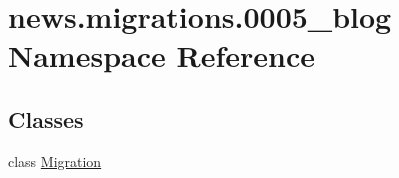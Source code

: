 \hypertarget{namespacenews_1_1migrations_1_10005__blog}{}\section{news.\+migrations.0005\+\_\+blog Namespace Reference}
\label{namespacenews_1_1migrations_1_10005__blog}
\subsection*{Classes}
\begin{DoxyCompactItemize}
\item 
class \mbox{\hyperlink{classnews_1_1migrations_1_10005__blog_1_1_migration}{Migration}}
\end{DoxyCompactItemize}
